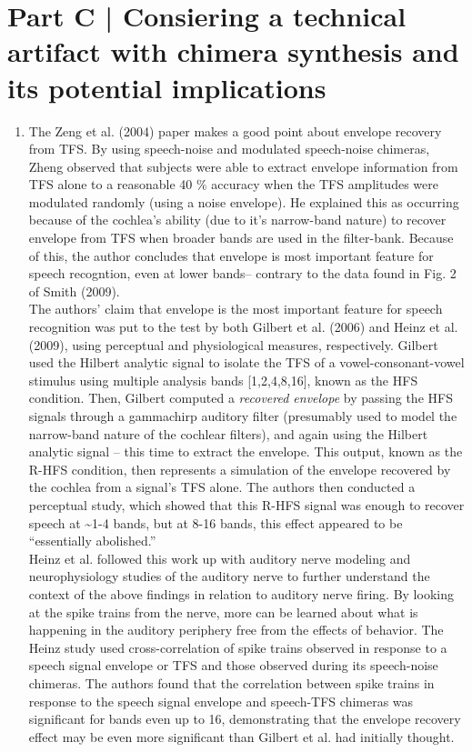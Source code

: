 \documentclass[9pt]{extarticle}
\begin{document}
\newpage
\section{Part C | Consiering a technical artifact with chimera synthesis and its potential implications} 

\begin{enumerate}[label = \alph*)]
\item The Zeng et al. (2004) paper makes a good point about envelope recovery from TFS. By using speech-noise and modulated speech-noise chimeras, Zheng observed that subjects were able to extract envelope information from TFS alone to a reasonable 40 \% accuracy when the TFS amplitudes were modulated randomly (using a noise envelope). He explained this as occurring because of the cochlea's ability (due to it's narrow-band nature) to recover envelope from TFS when broader bands are used in the filter-bank. Because of this, the author concludes that envelope is most important feature for speech recogntion, even at lower bands-- contrary to the data found in Fig. 2 of Smith (2009).\\

The authors' claim that envelope is the most important feature for speech recognition was put to the test by both Gilbert et al. (2006) and Heinz et al. (2009), using perceptual and physiological measures, respectively. Gilbert used the Hilbert analytic signal to isolate the TFS of a vowel-consonant-vowel stimulus using multiple analysis bands [1,2,4,8,16], known as the HFS condition. Then, Gilbert computed a \textit{recovered envelope} by passing the HFS signals through a gammachirp auditory filter (presumably used to model the narrow-band nature of the cochlear filters), and again using the Hilbert analytic signal -- this time to extract the envelope. This output, known as the R-HFS condition, then represents a simulation of the envelope recovered by the cochlea from a signal's TFS alone. The authors then conducted a perceptual study, which showed that this R-HFS signal was enough to recover speech at \textasciitilde 1-4 bands, but at 8-16 bands, this effect appeared to be ``essentially abolished.''\\

Heinz et al. followed this work up with auditory nerve modeling and neurophysiology studies of the auditory nerve to further understand the context of the above findings in relation to auditory nerve firing. By looking at the spike trains from the nerve, more can be learned about what is happening in the auditory periphery free from the effects of behavior. The Heinz study used cross-correlation of spike trains observed in response to a speech signal envelope or TFS and those observed during its speech-noise chimeras. The authors found that the correlation between spike trains in response to the speech signal envelope and speech-TFS chimeras was significant for bands even up to 16, demonstrating that the envelope recovery effect may be even more significant than Gilbert et al. had initially thought.\\


\end{enumerate}
\end{document}
